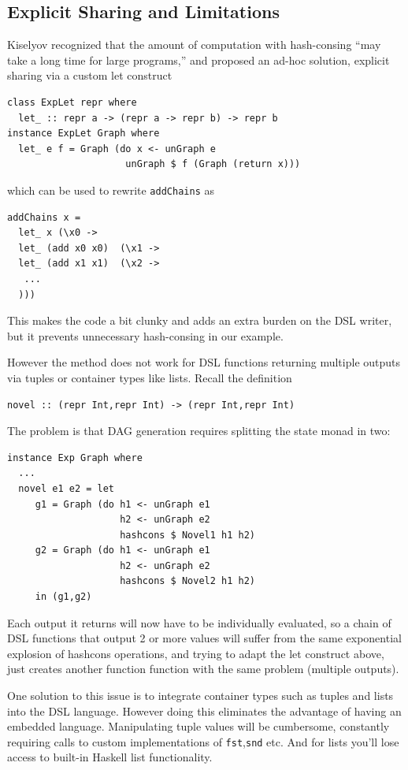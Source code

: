 \documentclass[runningheads]{llncs}
\begin{document}
\subsection{Explicit Sharing and Limitations} \label{limitexplicit}

Kiselyov \cite{kiselyov:sharing} recognized that the amount of computation with hash-consing ``may take a long time for large programs,'' 
and proposed an ad-hoc solution, explicit sharing via a
custom let construct
\begin{verbatim}
class ExpLet repr where
  let_ :: repr a -> (repr a -> repr b) -> repr b
instance ExpLet Graph where
  let_ e f = Graph (do x <- unGraph e
                     unGraph $ f (Graph (return x)))
\end{verbatim}
which can be used to rewrite \texttt{addChains} as
\begin{verbatim}
addChains x =
  let_ x (\x0 ->
  let_ (add x0 x0)  (\x1 ->
  let_ (add x1 x1)  (\x2 ->
   ...
  )))
\end{verbatim}
This makes the code a bit clunky and adds an extra burden on the DSL writer, but
it prevents unnecessary hash-consing in our example.

However the method does not work for DSL functions
returning multiple outputs via tuples or container types like lists. Recall the definition
\begin{verbatim}
novel :: (repr Int,repr Int) -> (repr Int,repr Int)
\end{verbatim}
The problem is that DAG generation requires splitting the state monad in two:
\begin{verbatim}
instance Exp Graph where
  ...
  novel e1 e2 = let
     g1 = Graph (do h1 <- unGraph e1
                    h2 <- unGraph e2
                    hashcons $ Novel1 h1 h2)
     g2 = Graph (do h1 <- unGraph e1
                    h2 <- unGraph e2
                    hashcons $ Novel2 h1 h2)
     in (g1,g2)
\end{verbatim}
Each output it returns will now have to be individually evaluated, so a
chain of DSL functions that output 2 or more values will suffer from the same
exponential explosion of hashcons operations,
and trying to adapt the let construct above,
just creates another function function with the same problem (multiple outputs).

One solution to this issue is to integrate container types such as tuples and
lists into the DSL language. However doing this eliminates the
advantage of having an embedded language.
Manipulating tuple values will be
cumbersome, constantly requiring calls to custom implementations of \texttt{fst},\texttt{snd} etc. 
And for lists you'll lose access to built-in Haskell
list functionality.
\end{document}
